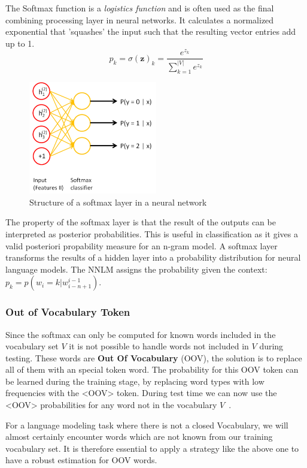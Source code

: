 The Softmax function is a \textit{logistics function} and is often used as the final combining processing layer in neural
networks. It calculates a normalized exponential that 'squashes' the input such that the resulting vector entries add up to 1.
\[
    p_k = \sigma(\mathbf{z})_k = \frac{e^{z_k}}{\sum_{k=1}^{|V|} e^{z_k}}
\]
\begin{figure}[H]
\begin{center}
  \includegraphics[width=0.5\textwidth]{./img/softmax_layer}
  \caption{Structure of a softmax layer in a neural network}
  \label{fig:softmax_layer}
\end{center}
\end{figure}

The property of the softmax layer is that the result of the outputs can be interpreted as posterior probabilities. 
This is useful in classification as it gives a valid posteriori propability measure for an n-gram model.
A softmax layer transforms the results of a hidden layer into a probability distribution for neural language models. The NNLM assigns the
probability given the context: $p_k = p(w_i = k | w_{i-n+1}^{i-1})$.

\subsubsection{Out of Vocabulary Token}

Since the softmax can only be computed for known words included in the vocabulary set $V$ it is not possible to handle words
not included in $V$ during testing.
These words are \textbf{Out Of Vocabulary} (OOV), the solution is to replace all of them with an special token word.
The probability for this OOV token can be learned during the training stage, by replacing word types with low frequencies with the <OOV> token.
During test time we can now use the <OOV> probabilities for any word not in the vocabulary $V$~\cite{DBLP:journals/corr/LingLMAADBT15}.

For a language modeling task where there is not a closed Vocabulary, we will almost certainly encounter words which are not known from
our training vocabulary set. It is therefore essential to apply a strategy like the above one to have a robust estimation
for OOV words.

